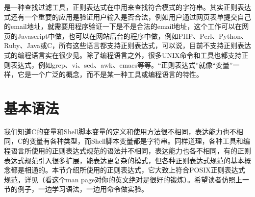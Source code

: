 是一种查找过滤工具，正则表达式在中用来查找符合模式的字符串。其实正则表达式还有一个重要的应用是验证用户输入是否合法，例如用户通过网页表单提交自己的email地址，就需要用程序验证一下是不是合法的email地址，这个工作可以在网页的Javascript中做，也可以在网站后台的程序中做，例如PHP、Perl、Python、Ruby、Java或C，所有这些语言都支持正则表达式，可以说，目前不支持正则表达式的编程语言实在很少见。除了编程语言之外，很多UNIX命令和工具也都支持正则表达式，例如grep、vi、sed、awk、emacs等等。“正则表达式”就像“变量”一样，它是一个广泛的概念，而不是某一种工具或编程语言的特性。




\section{基本语法}
%
我们知道C的变量和Shell脚本变量的定义和使用方法很不相同，表达能力也不相同，C的变量有各种类型，而Shell脚本变量都是字符串。同样道理，各种工具和编程语言所使用的正则表达式规范的语法并不相同，表达能力也各不相同，有的正则表达式规范引入很多扩展，能表达更复杂的模式，但各种正则表达式规范的基本概念都是相通的。本节介绍所使用的正则表达式，它大致上符合POSIX正则表达式规范，详见（看这个man page对你的英文绝对是很好的锻炼）。希望读者仿照上一节的例子，一边学习语法，一边用命令做实验。


